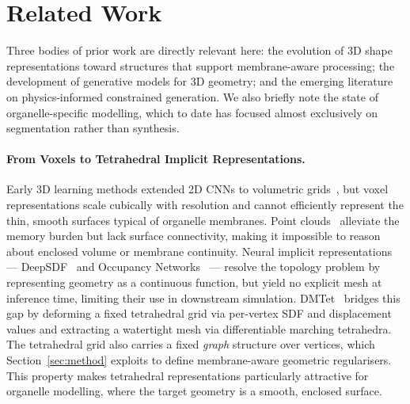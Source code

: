 \documentclass[10pt, a4paper, twocolumn]{article}
\begin{document}
\section{Related Work}
\label{sec:related}

Three bodies of prior work are directly relevant here: the evolution of 3D shape representations toward structures that support membrane-aware processing; the development of generative models for 3D geometry; and the emerging literature on physics-informed constrained generation. We also briefly note the state of organelle-specific modelling, which to date has focused almost exclusively on segmentation rather than synthesis.

\paragraph{From Voxels to Tetrahedral Implicit Representations.}
Early 3D learning methods extended 2D CNNs to volumetric grids~\cite{wu2016learning}, but voxel representations scale cubically with resolution and cannot efficiently represent the thin, smooth surfaces typical of organelle membranes. Point clouds~\cite{achlioptas2018learning} alleviate the memory burden but lack surface connectivity, making it impossible to reason about enclosed volume or membrane continuity. Neural implicit representations — DeepSDF~\cite{park2019deepsdf} and Occupancy Networks~\cite{mescheder2019occupancy} — resolve the topology problem by representing geometry as a continuous function, but yield no explicit mesh at inference time, limiting their use in downstream simulation. DMTet~\cite{shen2021dmtet} bridges this gap by deforming a fixed tetrahedral grid via per-vertex SDF and displacement values and extracting a watertight mesh via differentiable marching tetrahedra. The tetrahedral grid also carries a fixed \emph{graph} structure over vertices, which Section~\ref{sec:method} exploits to define membrane-aware geometric regularisers. This property makes tetrahedral representations particularly attractive for organelle modelling, where the target geometry is a smooth, enclosed surface.
\end{document}
